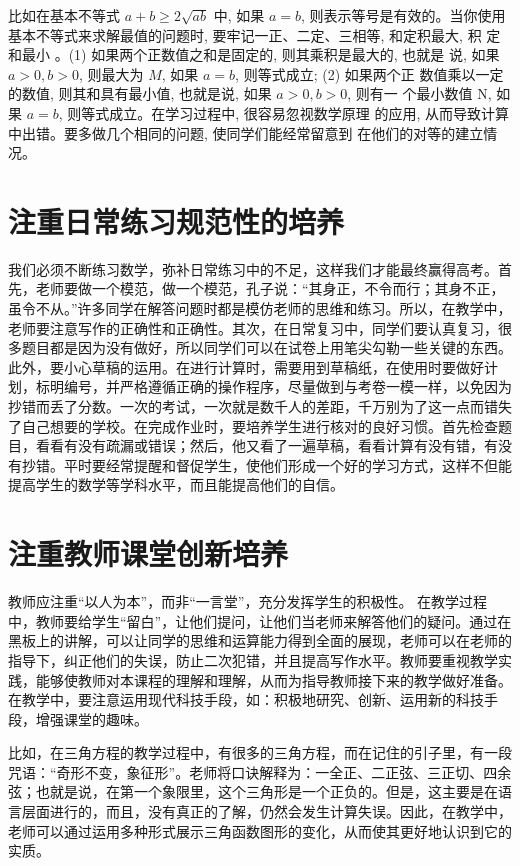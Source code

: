 比如在基本不等式 $a+b \geq 2 \sqrt{a b}$ 中, 如果 $a=b$, 则表示等号是有效的。当你使用 基本不等式来求解最值的问题时, 要牢记一正、二定、三相等, 和定积最大, 积 定和最小\cite{付麦霞2013利用基本不等式求最值问题探究} 。(1) 如果两个正数值之和是固定的, 则其乘积是最大的, 也就是 说, 如果 $a>0, b>0$, 则最大为 $M$, 如果 $a=b$, 则等式成立; (2) 如果两个正 数值乘以一定的数值, 则其和具有最小值, 也就是说, 如果 $a>0, b>0$, 则有一 个最小数值 $\mathrm{N}$, 如果 $a=b$, 则等式成立。在学习过程中, 很容易忽视数学原理 的应用, 从而导致计算中出错。要多做几个相同的问题, 使同学们能经常留意到 在他们的对等的建立情况。

\section{注重日常练习规范性的培养}

我们必须不断练习数学，弥补日常练习中的不足，这样我们才能最终赢得高考。首先，老师要做一个模范，做一个模范，孔子说：“其身正，不令而行；其身不正，虽令不从。”许多同学在解答问题时都是模仿老师的思维和练习。所以，在教学中，老师要注意写作的正确性和正确性。其次，在日常复习中，同学们要认真复习，很多题目都是因为没有做好，所以同学们可以在试卷上用笔尖勾勒一些关键的东西。此外，要小心草稿的运用。在进行计算时，需要用到草稿纸，在使用时要做好计划，标明编号，并严格遵循正确的操作程序，尽量做到与考卷一模一样，以免因为抄错而丢了分数。一次的考试，一次就是数千人的差距，千万别为了这一点而错失了自己想要的学校。在完成作业时，要培养学生进行核对的良好习惯。首先检查题目，看看有没有疏漏或错误；然后，他又看了一遍草稿，看看计算有没有错，有没有抄错。平时要经常提醒和督促学生，使他们形成一个好的学习方式，这样不但能提高学生的数学等学科水平，而且能提高他们的自信。




\section{注重教师课堂创新培养}

教师应注重“以人为本”，而非“一言堂”，充分发挥学生的积极性。
在教学过程中，教师要给学生“留白”，让他们提问，让他们当老师来解答他们的疑问。通过在黑板上的讲解，可以让同学的思维和运算能力得到全面的展现，老师可以在老师的指导下，纠正他们的失误，防止二次犯错，并且提高写作水平。教师要重视教学实践，能够使教师对本课程的理解和理解，从而为指导教师接下来的教学做好准备。在教学中，要注意运用现代科技手段，如：积极地研究、创新、运用新的科技手段，增强课堂的趣味。

比如，在三角方程的教学过程中，有很多的三角方程，而在记住的引子里，有一段咒语：“奇形不变，象征形”。老师将口诀解释为：一全正、二正弦、三正切、四余弦\cite{袁蕾2018信息化背景下小组合作式教学的教学设计}；也就是说，在第一个象限里，这个三角形是一个正负的。但是，这主要是在语言层面进行的，而且，没有真正的了解，仍然会发生计算失误。因此，在教学中，老师可以通过运用多种形式展示三角函数图形的变化，从而使其更好地认识到它的实质。



